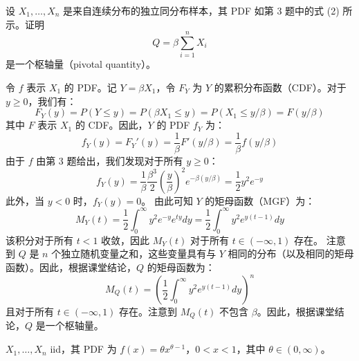 \begin{questions}
\question
设 $X_1, \dots, X_n$ 是来自连续分布的独立同分布样本，其 PDF 如第 3 题中的式 (2) 所示。证明
\[
Q = \beta \sum_{i=1}^n X_i
\]
是一个枢轴量（pivotal quantity）。

\begin{solution}
令 $f$ 表示 $X_1$ 的 PDF。记 $Y = \beta X_1$，令 $F_Y$ 为 $Y$ 的累积分布函数（CDF）。对于 $y \ge 0$，我们有：
\[
F_Y(y) = P(Y \le y) = P(\beta X_1 \le y) = P(X_1 \le y/\beta) = F(y/\beta)
\]
其中 $F$ 表示 $X_1$ 的 CDF。因此，$Y$ 的 PDF $f_Y$ 为：
\[
f_Y(y) = F_Y'(y) = \frac{1}{\beta} F'(y/\beta) = \frac{1}{\beta} f(y/\beta)
\]
由于 $f$ 由第 3 题给出，我们发现对于所有 $y \ge 0$：
\[
f_Y(y) = \frac{1}{\beta} \frac{\beta^3}{2} \left( \frac{y}{\beta} \right)^2 e^{-\beta(y/\beta)} = \frac{1}{2} y^2 e^{-y}
\]
此外，当 $y < 0$ 时，$f_Y(y) = 0$。
由此可知 $Y$ 的矩母函数（MGF）为：
\[
M_Y(t) = \frac{1}{2} \int_0^\infty y^2 e^{-y} e^{ty} dy = \frac{1}{2} \int_0^\infty y^2 e^{y(t-1)} dy
\]
该积分对于所有 $t < 1$ 收敛，因此 $M_Y(t)$ 对于所有 $t \in (-\infty, 1)$ 存在。
注意到 $Q$ 是 $n$ 个独立随机变量之和，这些变量具有与 $Y$ 相同的分布（以及相同的矩母函数）。因此，根据课堂结论，$Q$ 的矩母函数为：
\[
M_Q(t) = \left( \frac{1}{2} \int_0^\infty y^2 e^{y(t-1)} dy \right)^n
\]
且对于所有 $t \in (-\infty, 1)$ 存在。注意到 $M_Q(t)$ 不包含 $\beta$。因此，根据课堂结论，$Q$ 是一个枢轴量。
\end{solution}

\question $X_1, \dots, X_n$ iid，其 PDF 为 $f(x) = \theta x^{\theta-1}$，$0 < x < 1$，其中 $\theta \in (0, \infty)$。

\end{questions}
